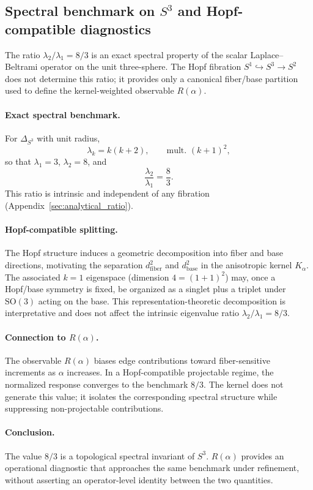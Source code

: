 \subsection*{Spectral benchmark on $S^3$ and Hopf-compatible diagnostics}
  \label{subsec:hopf_spectral}

  The ratio $\lambda_2/\lambda_1=8/3$ is an exact spectral property of
  the scalar Laplace--Beltrami operator on the unit three-sphere.
  The Hopf fibration $S^1\hookrightarrow S^3\to S^2$ does not determine
  this ratio; it provides only a canonical fiber/base partition used
  to define the kernel-weighted observable $R(\alpha)$.

  \paragraph{Exact spectral benchmark.}
    For $\Delta_{S^3}$ with unit radius,
    \[
      \lambda_k = k(k+2), \qquad \text{mult. }(k+1)^2,
    \]
    so that $\lambda_1=3$, $\lambda_2=8$, and
    \[
      \frac{\lambda_2}{\lambda_1}=\frac{8}{3}.
    \]
    This ratio is intrinsic and independent of any fibration
    (Appendix~\ref{sec:analytical_ratio}).

  \paragraph{Hopf-compatible splitting.}
    The Hopf structure induces a geometric decomposition into
    fiber and base directions, motivating the separation
    $d_{\mathrm{fiber}}^2$ and $d_{\mathrm{base}}^2$
    in the anisotropic kernel $K_\alpha$.
    The associated $k=1$ eigenspace (dimension $4=(1+1)^2$)
    may, once a Hopf/base symmetry is fixed, be organized as
    a singlet plus a triplet under $\mathrm{SO}(3)$ acting on the base.
    This representation-theoretic decomposition is interpretative
    and does not affect the intrinsic eigenvalue ratio
    $\lambda_2/\lambda_1 = 8/3$.

  \paragraph{Connection to $R(\alpha)$.}
    The observable
    $R(\alpha)$ biases edge contributions toward fiber-sensitive
    increments as $\alpha$ increases.
    In a Hopf-compatible projectable regime,
    the normalized response converges to the benchmark $8/3$.
    The kernel does not generate this value; it isolates
    the corresponding spectral structure while suppressing
    non-projectable contributions.

  \paragraph{Conclusion.}
    The value $8/3$ is a topological spectral invariant of $S^3$.
    $R(\alpha)$ provides an operational diagnostic that approaches
    the same benchmark under refinement, without asserting an
    operator-level identity between the two quantities.
